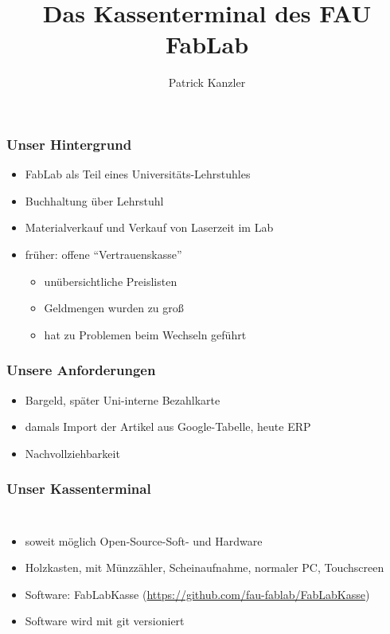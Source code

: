 \documentclass[german]{beamer} %
\title{Das Kassenterminal des FAU FabLab}
\author{Patrick Kanzler}
\newcommand{\images}{kassenterminal/}
\begin{document}

\maketitle


\frame{\tableofcontents}


\begin{frame}
\frametitle{Unser Hintergrund}
\begin{itemize}
 \item FabLab als Teil eines Universitäts-Lehrstuhles
 \item Buchhaltung über Lehrstuhl
 \item Materialverkauf und Verkauf von Laserzeit im Lab
 \item früher: offene \enquote{Vertrauenskasse}
   \begin{itemize}
   	\item unübersichtliche Preislisten
   	\item Geldmengen wurden zu groß
    \item hat zu Problemen beim Wechseln geführt
   \end{itemize} 	
\end{itemize}	 
\end{frame}

\begin{frame}
\frametitle{Unsere Anforderungen}
 \begin{itemize}
 	\item Bargeld, später Uni-interne Bezahlkarte
 	\item damals Import der Artikel aus Google-Tabelle, heute ERP
	\item Nachvollziehbarkeit
 \end{itemize}
\end{frame}

\begin{frame}
\frametitle{Unser Kassenterminal}
\begin{columns}[c]
 \begin{itemize}
 \item soweit möglich Open-Source-Soft- und Hardware
 \item Holzkasten, mit Münzzähler, Scheinaufnahme, normaler PC, Touchscreen
 \item Software: FabLabKasse (\url{https://github.com/fau-fablab/FabLabKasse})
 \item Software wird mit git versioniert
 \end{itemize}
 \end{columns}
\end{frame}
\end{document}
